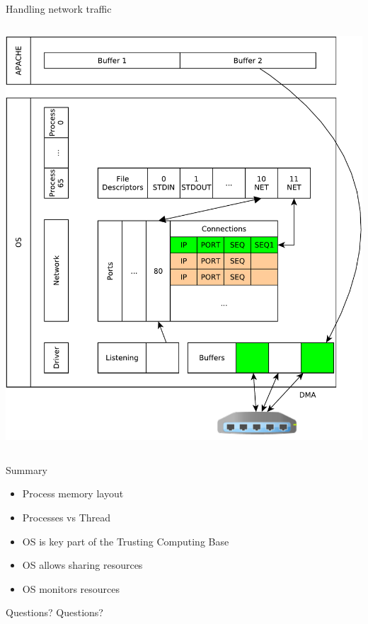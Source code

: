 \documentclass{beamer}
\begin{document}
\begin{frame}[fragile]{Handling network traffic}
\begin{columns}
\begin{column}[t]{0.5\textwidth}
\begin{center}
{  \includegraphics[width=1\linewidth]{sock_mem_13}
     }
\end{center}
\end{column}
\end{columns}
\end{frame}

\begin{frame}{Summary}
  \begin{itemize}
    \item Process memory layout
    \item Processes vs Thread
    \item OS is key part of the Trusting Computing Base
    \item OS allows sharing resources
    \item OS monitors resources
  \end{itemize}
\end{frame}

\begin{frame}{Questions?}
    Questions?
\end{frame}
\end{document}
